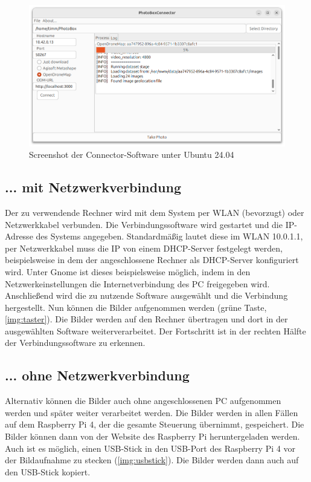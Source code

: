 \documentclass[./00PhotoBox.tex]{subfiles}
\begin{document}
\begin{figure}
    \centering
    \includegraphics[width=1\textwidth]{./img/5_software/connector_screenshot.png}
    \caption{Screenshot der Connector-Software unter Ubuntu 24.04}
    \label{img:connector}
\end{figure}

\subsection{... mit Netzwerkverbindung}
Der zu verwendende Rechner wird mit dem System per WLAN (bevorzugt) oder Netzwerkkabel verbunden. Die Verbindungssoftware wird gestartet und die IP-Adresse des Systems angegeben. Standardmäßig lautet diese im WLAN 10.0.1.1, per Netzwerkkabel muss die IP von einem DHCP-Server festgelegt werden, beispielsweise in dem der angeschlossene Rechner als DHCP-Server konfiguriert wird. Unter Gnome ist dieses beispielsweise möglich, indem in den Netzwerkeinstellungen die Internetverbindung des PC freigegeben wird.
Anschließend wird die zu nutzende Software ausgewählt und die Verbindung hergestellt.
Nun können die Bilder aufgenommen werden (grüne Taste, \autoref{img:taster}). Die Bilder werden auf den Rechner übertragen und dort in der ausgewählten Software weiterverarbeitet. Der Fortschritt ist in der rechten Hälfte der Verbindungssoftware zu erkennen.

\subsection{... ohne Netzwerkverbindung}
Alternativ können die Bilder auch ohne angeschlossenen PC aufgenommen werden und später weiter verarbeitet werden. Die Bilder werden in allen Fällen auf dem Raspberry Pi 4, der die gesamte Steuerung übernimmt, gespeichert. Die Bilder können dann von der Website des Raspberry Pi heruntergeladen werden. Auch ist es möglich, einen USB-Stick in den USB-Port des Raspberry Pi 4 vor der Bildaufnahme zu stecken (\autoref{img:usbstick}). Die Bilder werden dann auch auf den USB-Stick kopiert.
\end{document}
